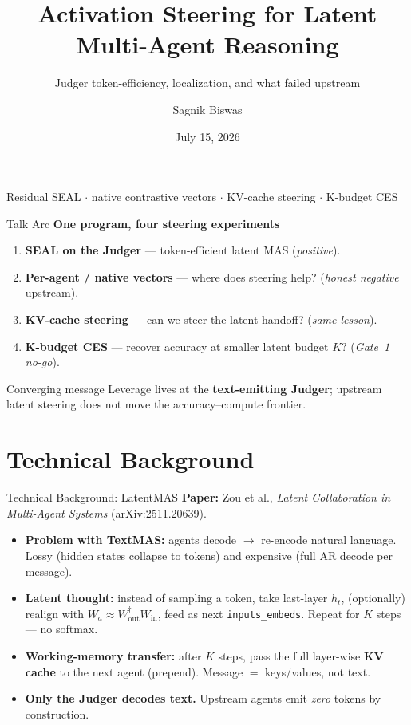 \documentclass{beamer}
\title{Activation Steering for Latent Multi-Agent Reasoning}
\subtitle{Judger token-efficiency, localization, and what failed upstream}
\author{Sagnik Biswas}
\date{July 15, 2026}
\begin{document}
\begin{frame}
    \titlepage
    \vspace{-0.8cm}
    \begin{center}\footnotesize
        Residual SEAL $\cdot$ native contrastive vectors $\cdot$ KV-cache steering $\cdot$ K-budget CES
    \end{center}
\end{frame}

\begin{frame}{Talk Arc}
    \textbf{One program, four steering experiments}
    \begin{enumerate}
        \item \textbf{SEAL on the Judger} --- token-efficient latent MAS (\emph{positive}).
        \item \textbf{Per-agent / native vectors} --- where does steering help? (\emph{honest negative} upstream).
        \item \textbf{KV-cache steering} --- can we steer the latent handoff? (\emph{same lesson}).
        \item \textbf{K-budget CES} --- recover accuracy at smaller latent budget $K$? (\emph{Gate~1 no-go}).
    \end{enumerate}
    \vspace{0.25cm}
    \begin{block}{Converging message}
        Leverage lives at the \textbf{text-emitting Judger}; upstream latent steering does not move the accuracy--compute frontier.
    \end{block}
\end{frame}

\section{Technical Background}
\begin{frame}{Technical Background: LatentMAS}
    \textbf{Paper:} Zou et al., \emph{Latent Collaboration in Multi-Agent Systems} (arXiv:2511.20639).
    \begin{itemize}
        \item \textbf{Problem with TextMAS:} agents decode $\rightarrow$ re-encode natural language. Lossy (hidden states collapse to tokens) and expensive (full AR decode per message).
        \item \textbf{Latent thought:} instead of sampling a token, take last-layer $h_t$, (optionally) realign with $W_a \approx W_{\text{out}}^{\dagger} W_{\text{in}}$, feed as next \texttt{inputs\_embeds}. Repeat for $K$ steps --- no softmax.
        \item \textbf{Working-memory transfer:} after $K$ steps, pass the full layer-wise \textbf{KV cache} to the next agent (prepend). Message $=$ keys/values, not text.
        \item \textbf{Only the Judger decodes text.} Upstream agents emit \emph{zero} tokens by construction.
    \end{itemize}
\end{frame}
\end{document}
